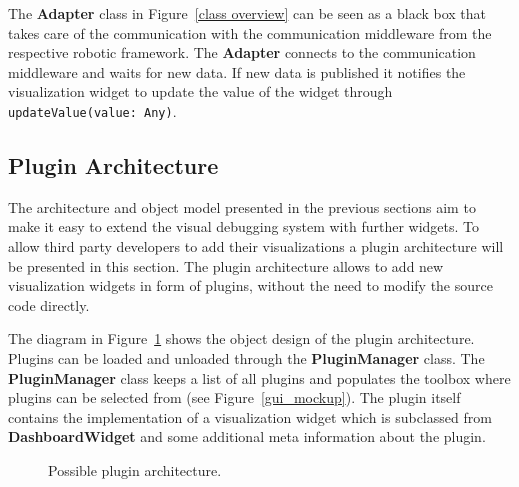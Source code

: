 The \textbf{Adapter} class in Figure~\ref{class overview} can be seen as a black box that takes care of the communication with the communication middleware from the respective robotic framework. The \textbf{Adapter} connects to the communication middleware and waits for new data. If new data is published it notifies the visualization widget to update the value of the widget through \verb+updateValue(value: Any)+.


\subsection{Plugin Architecture}
\label{plugin_architecture_section}
The architecture and object model presented in the previous sections aim to make it easy to extend the visual debugging system with further widgets. To allow third party developers to add their visualizations a plugin architecture will be presented in this section. The plugin architecture allows to add new visualization widgets in form of plugins, without the need to modify the source code directly.

The diagram in Figure~\ref{plugin_architecture_diagram} shows the object design of the plugin architecture. Plugins can be loaded and unloaded through the \textbf{PluginManager} class. The \textbf{PluginManager} class keeps a list of all plugins and populates the toolbox where plugins can be selected from (see Figure~\ref{gui_mockup}). The plugin itself contains the implementation of a visualization widget which is subclassed from \textbf{DashboardWidget} and some additional meta information about the plugin.

\begin{figure}%
  \centering
  \caption{Possible plugin architecture.}
  \label{plugin_architecture_diagram}
\end{figure}
